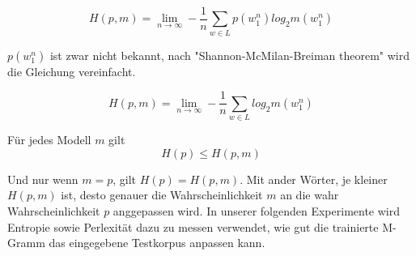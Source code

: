 \begin{equation}
H(p,m)=\lim_{n\to\infty}-\frac{1}{n}\sum_{w\in L}p(w_{1}^{n})log_{2}m(w_{1}^{n})
\end{equation}

$p(w_{1}^{n})$ ist zwar nicht bekannt, nach "Shannon-McMilan-Breiman theorem" wird die Gleichung vereinfacht. 

\begin{equation}
H(p,m)=\lim_{n\to\infty}-\frac{1}{n}\sum_{w\in L}log_{2}m(w_{1}^{n})
\end{equation}

F\"ur jedes Modell $m$ gilt \\
\begin{equation}
H(p)\leq H(p,m)
\end{equation}

Und nur wenn $m=p$, gilt $H(p)=H(p,m)$. Mit ander W\"orter, je kleiner $H(p,m)$ ist, desto genauer die Wahrscheinlichkeit $m$ an die wahr Wahrscheinlichkeit $p$ anggepassen wird.
In unserer folgenden Experimente wird Entropie sowie Perlexit\"at dazu zu messen verwendet, wie gut die trainierte M-Gramm das eingegebene Testkorpus anpassen kann.

